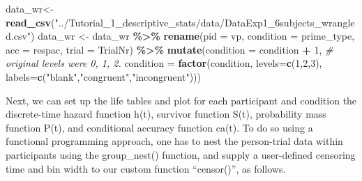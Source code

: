 \documentclass[
  man, donotrepeattitle,floatsintext]{apa6}
\newenvironment{Shaded}{\begin{snugshade}}{\end{snugshade}}
\newcommand{\AttributeTok}[1]{\textcolor[rgb]{0.13,0.29,0.53}{#1}}
\newcommand{\CommentTok}[1]{\textcolor[rgb]{0.56,0.35,0.01}{\textit{#1}}}
\newcommand{\DecValTok}[1]{\textcolor[rgb]{0.00,0.00,0.81}{#1}}
\newcommand{\FunctionTok}[1]{\textcolor[rgb]{0.13,0.29,0.53}{\textbf{#1}}}
\newcommand{\NormalTok}[1]{#1}
\newcommand{\OtherTok}[1]{\textcolor[rgb]{0.56,0.35,0.01}{#1}}
\newcommand{\SpecialCharTok}[1]{\textcolor[rgb]{0.81,0.36,0.00}{\textbf{#1}}}
\newcommand{\StringTok}[1]{\textcolor[rgb]{0.31,0.60,0.02}{#1}}
\begin{document}
\begin{Shaded}
\begin{Highlighting}[]
\NormalTok{data\_wr}\OtherTok{\textless{}{-}}\FunctionTok{read\_csv}\NormalTok{(}\StringTok{"../Tutorial\_1\_descriptive\_stats/data/DataExp1\_6subjects\_wrangled.csv"}\NormalTok{)}
\NormalTok{data\_wr }\OtherTok{\textless{}{-}}\NormalTok{ data\_wr }\SpecialCharTok{\%\textgreater{}\%} 
  \FunctionTok{rename}\NormalTok{(}\AttributeTok{pid =}\NormalTok{ vp, }\AttributeTok{condition =}\NormalTok{ prime\_type, }\AttributeTok{acc =}\NormalTok{ respac, }\AttributeTok{trial =}\NormalTok{ TrialNr) }\SpecialCharTok{\%\textgreater{}\%} 
  \FunctionTok{mutate}\NormalTok{(}\AttributeTok{condition =}\NormalTok{ condition }\SpecialCharTok{+} \DecValTok{1}\NormalTok{, }\CommentTok{\# original levels were 0, 1, 2.}
         \AttributeTok{condition =} \FunctionTok{factor}\NormalTok{(condition, }
                            \AttributeTok{levels=}\FunctionTok{c}\NormalTok{(}\DecValTok{1}\NormalTok{,}\DecValTok{2}\NormalTok{,}\DecValTok{3}\NormalTok{), }
                            \AttributeTok{labels=}\FunctionTok{c}\NormalTok{(}\StringTok{"blank"}\NormalTok{,}\StringTok{"congruent"}\NormalTok{,}\StringTok{"incongruent"}\NormalTok{)))}
\end{Highlighting}
\end{Shaded}

\normalsize

Next, we can set up the life tables and plot for each participant and condition the discrete-time hazard function h(t), survivor function S(t), probability mass function P(t), and conditional accuracy function ca(t). To do so using a functional programming approach, one has to nest the person-trial data within participants using the group\_nest() function, and supply a user-defined censoring time and bin width to our custom function ``censor()'', as follows.

\footnotesize
\end{document}
